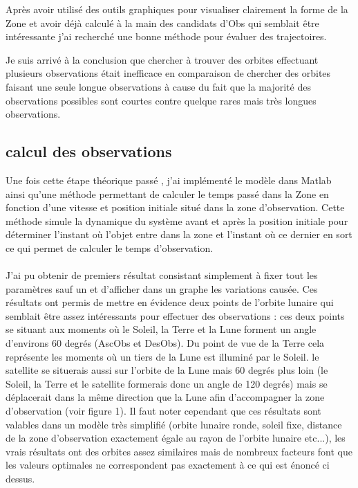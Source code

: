 \documentclass[12pt]{article} %
\begin{document}
		Après avoir utilisé des outils graphiques pour visualiser clairement la forme de la \gls{Zone} et avoir déjà calculé à la main des candidats d'\gls{Obs} qui semblait être intéressante j'ai recherché une bonne méthode pour évaluer des trajectoires.
		
		Je suis arrivé à la conclusion que chercher à trouver des orbites effectuant plusieurs observations était inefficace en comparaison de chercher des orbites faisant une seule longue observations à cause du fait que la majorité des observations possibles sont courtes contre quelque rares mais très longues observations.
		
		\subsection{calcul des observations}
		Une fois cette étape théorique passé , j'ai implémenté le modèle dans Matlab ainsi qu'une méthode permettant de calculer le temps passé dans la \gls{Zone} en fonction d'une vitesse et position initiale situé dans la zone d'observation. Cette méthode simule la dynamique du système avant et après la position initiale pour déterminer l'instant où l'objet entre dans la zone et l'instant où ce dernier en sort ce qui permet de calculer le temps d'observation.
		\\ \\
		J'ai pu obtenir de premiers résultat consistant simplement à fixer tout les paramètres sauf un et d'afficher dans un graphe les variations causée. Ces résultats ont permis de mettre en évidence deux points de l'orbite lunaire qui semblait être assez intéressants pour effectuer des observations : ces deux points se situant aux moments où le Soleil, la Terre et la Lune forment un angle d'environs 60 degrés (\gls{AscObs} et \gls{DesObs}). Du point de vue de la Terre cela représente les moments où un tiers de la Lune est illuminé par le Soleil. le satellite se situerais aussi sur l'orbite de la Lune mais 60 degrés plus loin (le Soleil, la Terre et le satellite formerais donc un angle de 120 degrés) mais se déplacerait dans la même direction que la Lune afin d'accompagner la zone d'observation (voir figure 1). Il faut noter cependant que ces résultats sont valables dans un modèle très simplifié (orbite lunaire ronde, soleil fixe, distance de la zone d'observation exactement égale au rayon de l'orbite lunaire etc...), les vrais résultats ont des orbites assez similaires mais de nombreux facteurs font que les valeurs optimales ne correspondent pas exactement à ce qui est énoncé ci dessus.
		
\end{document}
